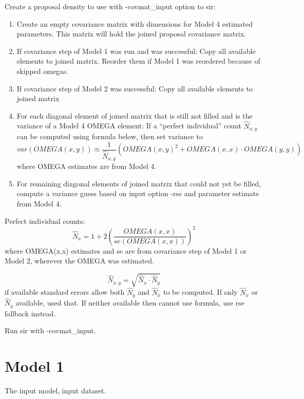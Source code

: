 Create a proposal density to use with -covmat\_input option to sir:
\begin{enumerate}
\item Create an empty covariance matrix with dimensions for Model 4 estimated parameters.
This matrix will hold the joined proposal covariance matrix.
\item If covariance step of Model 1 was run and was successful: Copy all available
elements to joined matrix. Reorder them if Model 1 was reordered because of skipped omegas.
\item If covariance step of Model 2 was successful: Copy all available
elements to joined matrix
\item For each diagonal element of joined matrix that is still not filled and is
the variance of a Model 4 OMEGA element: If a ``perfect individual'' count $\hat{N}_{x,y}$ can
be computed using formula below, then set variance to
\[
var\left(OMEGA(x,y)\right)\approx \frac{1}{\hat{N}_{x,y}}
\left( OMEGA(x,y)^2 + OMEGA(x,x)\cdot OMEGA(y,y) \right)
\]
where OMEGA estimates are from Model 4.
\item For remaining diagonal elements of joined matrix that could not yet be filled,
compute a variance guess based on input option -rse and parameter estimate from Model 4.
\end{enumerate}

Perfect individual counts:
\[
\hat{N}_{x}=1+2\left(\frac{OMEGA(x,x)}{se\left(OMEGA(x,x)\right)}\right)^2
\]
where OMEGA(x,x) estimates and se are from covariance step of Model 1 or Model 2, wherever the
OMEGA was estimated.

\[
\hat{N}_{x,y} = \sqrt{\hat{N}_{x}\cdot \hat{N}_{y}}
\] if available standard errors allow both $\hat{N}_{y}$ and $\hat{N}_{x}$ to be computed.
If only $\hat{N}_{x}$ or $\hat{N}_{y}$ available, used that. If neither available then
cannot use formula, use rse fallback instead.

Run sir with -covmat\_input.

\section{Model 1}
The input model, input dataset.


